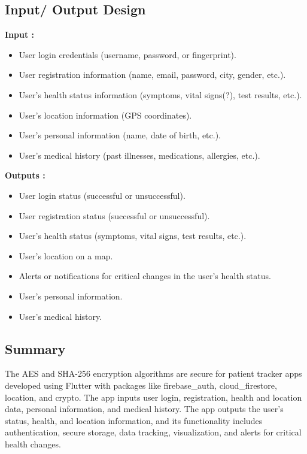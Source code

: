 \documentclass[12pt]{article}
\begin{document}
			\subsection{Input/ Output Design}
			\textbf{Input :}
			\begin{itemize}
				\item User login credentials (username, password, or fingerprint).
				\item User registration information (name, email, password, city, gender, etc.).
				\item User's health status information (symptoms, vital signs(?), test results, etc.).
				\item User's location information (GPS coordinates).
				\item User's personal information (name, date of birth, etc.).
				\item User's medical history (past illnesses, medications, allergies, etc.).
				
			\end{itemize}
			\textbf{Outputs :}
			\begin{itemize}
				\item User login status (successful or unsuccessful).
				\item User registration status (successful or unsuccessful).
				\item User's health status (symptoms, vital signs, test results, etc.).
				\item User's location on a map.
				\item Alerts or notifications for critical changes in the user's health status.
				\item User's personal information.
				\item User's medical history.
				
			\end{itemize}
			\subsection{Summary}
			\quad The AES and SHA-256 encryption algorithms are secure for patient tracker apps developed using Flutter with packages like firebase\_auth, cloud\_firestore, location, and crypto. The app inputs user login, registration, health and location data, personal information, and medical history. The app outputs the user's status, health, and location information, and its functionality includes authentication, secure storage, data tracking, visualization, and alerts for critical health changes.
			
\end{document}
